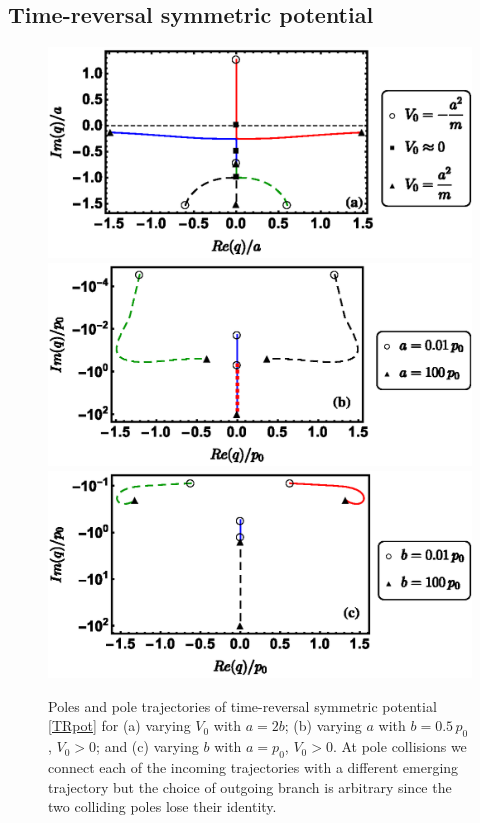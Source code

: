 \subsection{Time-reversal symmetric potential}
%
%
\begin{figure}[h]
  \centering
	\includegraphics[width=0.75\linewidth]{Figures/VSymEigenvalsVaryingV0_Momentum.eps}
	\includegraphics[width=0.75\linewidth]{Figures/VSymEigenvalsVaryingA_Momentum_Log.eps}
	\includegraphics[width=0.75\linewidth]{Figures/VSymEigenvalsVaryingB_Momentum_Log.eps}
	\caption{ Poles and pole trajectories of time-reversal symmetric potential \eqref{TRpot} for (a) varying $V_0$ with $a=2 b$; (b) varying $a$ with $b=0.5\, p_0$, $V_0>0$; and (c) varying $b$ with $a=p_0$,
	$V_0>0$. At pole collisions we connect each of the incoming trajectories with a different emerging trajectory but the choice of outgoing branch  is arbitrary since the two colliding poles lose their identity.}
	\label{fig:VSymEigenvals}
\end{figure}


